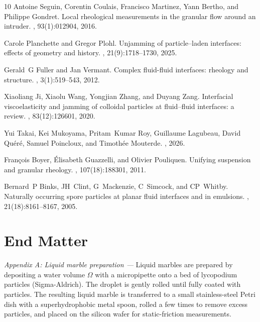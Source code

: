 \documentclass[twocolumn, prl,
 amsmath,amssymb,
 superscriptaddress,aps,
]{revtex4-2}
\begin{document}
\begin{thebibliography}{10}
	Antoine Seguin, Corentin Coulais, Francisco Martinez, Yann Bertho, and Philippe
	Gondret.
	\newblock Local rheological measurements in the granular flow around an
	intruder.
	, 93(1):012904, 2016.
	
	Carole Planchette and Gregor Plohl.
	\newblock Unjamming of particle--laden interfaces: effects of geometry and
	history.
	, 21(9):1718--1730, 2025.
	
	Gerald~G Fuller and Jan Vermant.
	\newblock Complex fluid-fluid interfaces: rheology and structure.
	,
	3(1):519--543, 2012.
	
	Xiaoliang Ji, Xiaolu Wang, Yongjian Zhang, and Duyang Zang.
	\newblock Interfacial viscoelasticity and jamming of colloidal particles at
	fluid--fluid interfaces: a review.
	, 83(12):126601, 2020.
	
	Yui Takai, Kei Mukoyama, Pritam~Kumar Roy, Guillaume Lagubeau, David
	Qu{\'e}r{\'e}, Samuel Poincloux, and Timoth{\'e}e Mouterde.
	, 2026.
	
	Fran{\c{c}}ois Boyer, {\'E}lisabeth Guazzelli, and Olivier Pouliquen.
	\newblock Unifying suspension and granular rheology.
	, 107(18):188301, 2011.
	
	Bernard~P Binks, JH~Clint, G~Mackenzie, C~Simcock, and CP~Whitby.
	\newblock Naturally occurring spore particles at planar fluid interfaces and in
	emulsions.
	, 21(18):8161--8167, 2005.
	
\end{thebibliography}



\appendix


\setcounter{figure}{0}
\renewcommand{\thefigure}{S\arabic{figure}}



\section{End Matter}

\textit{Appendix A: Liquid marble preparation ---} Liquid marbles are prepared by depositing a water volume $\Omega$ with a micropipette onto a bed of lycopodium particles (Sigma-Aldrich). The droplet is gently rolled until fully coated with particles. The resulting liquid marble is transferred to a small stainless-steel Petri dish with a superhydrophobic metal spoon, rolled a few times to remove excess particles, and placed on the silicon wafer for static-friction measurements.
\\
\end{document}

